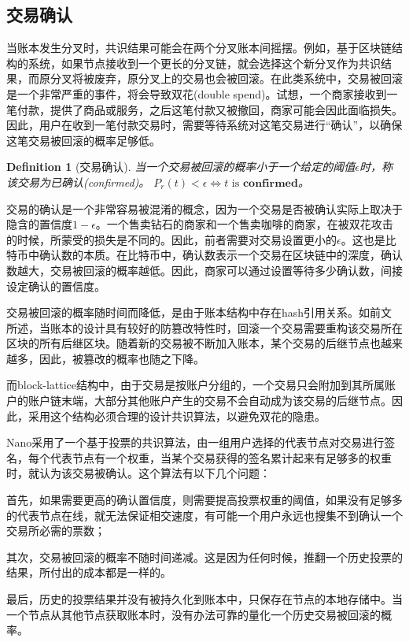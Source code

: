\documentclass[UTF8,nofonts]{ctexart}
\newtheorem{definition}{Definition}[section]
\begin{document}
\begin{multicols}{2}
\subsection{交易确认}
当账本发生分叉时，共识结果可能会在两个分叉账本间摇摆。例如，基于区块链结构的系统，如果节点接收到一个更长的分叉链，就会选择这个新分叉作为共识结果，而原分叉将被废弃，原分叉上的交易也会被回滚。在此类系统中，交易被回滚是一个非常严重的事件，将会导致双花(double spend)。试想，一个商家接收到一笔付款，提供了商品或服务，之后这笔付款又被撤回，商家可能会因此面临损失。因此，用户在收到一笔付款交易时，需要等待系统对这笔交易进行“确认”，以确保这笔交易被回滚的概率足够低。

\begin{definition}[交易确认]
当一个交易被回滚的概率小于一个给定的阈值$\epsilon$时，称该交易为已确认(confirmed)。
$P_{r}(t) < \epsilon \Leftrightarrow t \text{ is } \boldsymbol{confirmed}$。
\end{definition}

交易的确认是一个非常容易被混淆的概念，因为一个交易是否被确认实际上取决于隐含的置信度$1-\epsilon$。一个售卖钻石的商家和一个售卖咖啡的商家，在被双花攻击的时候，所蒙受的损失是不同的。因此，前者需要对交易设置更小的$\epsilon$。这也是比特币中确认数的本质。在比特币中，确认数表示一个交易在区块链中的深度，确认数越大，交易被回滚的概率越低\cite{nakamoto2008bitcoin}。因此，商家可以通过设置等待多少确认数，间接设定确认的置信度。

交易被回滚的概率随时间而降低，是由于账本结构中存在hash引用关系。如前文所述，当账本的设计具有较好的防篡改特性时，回滚一个交易需要重构该交易所在区块的所有后继区块。随着新的交易被不断加入账本，某个交易的后继节点也越来越多，因此，被篡改的概率也随之下降。

而block-lattice结构中，由于交易是按账户分组的，一个交易只会附加到其所属账户的账户链末端，大部分其他账户产生的交易不会自动成为该交易的后继节点。因此，采用这个结构必须合理的设计共识算法，以避免双花的隐患。

Nano采用了一个基于投票的共识算法\cite{nano}，由一组用户选择的代表节点对交易进行签名，每个代表节点有一个权重，当某个交易获得的签名累计起来有足够多的权重时，就认为该交易被确认。这个算法有以下几个问题：

首先，如果需要更高的确认置信度，则需要提高投票权重的阈值，如果没有足够多的代表节点在线，就无法保证相交速度，有可能一个用户永远也搜集不到确认一个交易所必需的票数；

其次，交易被回滚的概率不随时间递减。这是因为任何时候，推翻一个历史投票的结果，所付出的成本都是一样的。

最后，历史的投票结果并没有被持久化到账本中，只保存在节点的本地存储中。当一个节点从其他节点获取账本时，没有办法可靠的量化一个历史交易被回滚的概率。


\end{multicols}
\end{document}
